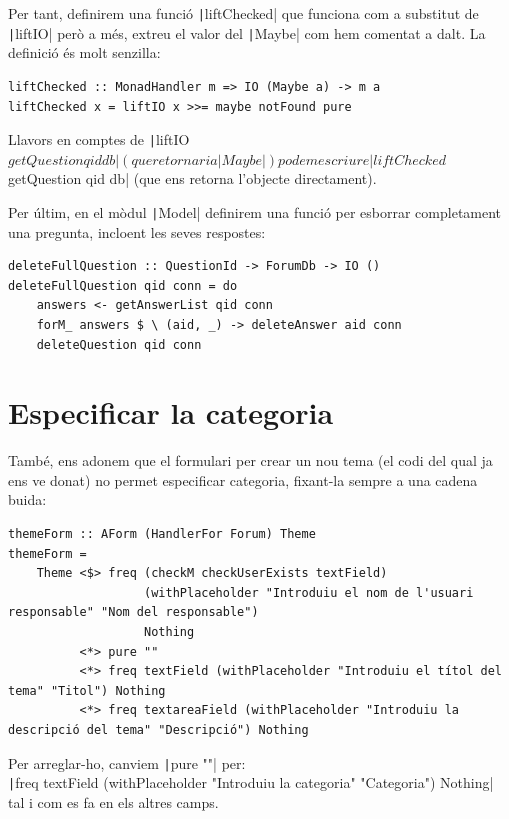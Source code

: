 \documentclass[catalan, a4paper]{scrartcl}
\begin{document}
Per tant, definirem una funció \texttt|liftChecked| que funciona com
a substitut de \texttt|liftIO| però a més, extreu el valor del \texttt|Maybe|
com hem comentat a dalt. La definició és molt senzilla:

\begin{verbatim}
liftChecked :: MonadHandler m => IO (Maybe a) -> m a
liftChecked x = liftIO x >>= maybe notFound pure
\end{verbatim}

Llavors en comptes de \texttt|liftIO $ getQuestion qid db| (que retornaria
\texttt|Maybe|) podem escriure \texttt|liftChecked $ getQuestion qid db|
(que ens retorna l'objecte directament).

Per últim, en el mòdul \texttt|Model| definirem una funció per esborrar
completament una pregunta, incloent les seves respostes:

\begin{verbatim}
deleteFullQuestion :: QuestionId -> ForumDb -> IO ()
deleteFullQuestion qid conn = do
    answers <- getAnswerList qid conn
    forM_ answers $ \ (aid, _) -> deleteAnswer aid conn
    deleteQuestion qid conn
\end{verbatim}


\section{\label{sec:form-category}Especificar la categoria}

També, ens adonem que el formulari per crear un nou tema (el codi del qual
ja ens ve donat) no permet especificar categoria, fixant-la sempre a una cadena
buida:

\begin{verbatim}
themeForm :: AForm (HandlerFor Forum) Theme
themeForm =
    Theme <$> freq (checkM checkUserExists textField)
                   (withPlaceholder "Introduiu el nom de l'usuari responsable" "Nom del responsable")
                   Nothing
          <*> pure ""
          <*> freq textField (withPlaceholder "Introduiu el títol del tema" "Titol") Nothing
          <*> freq textareaField (withPlaceholder "Introduiu la descripció del tema" "Descripció") Nothing
\end{verbatim}

Per arreglar-ho, canviem \texttt|pure ""| per: \\
\texttt|freq textField (withPlaceholder "Introduiu la categoria" "Categoria") Nothing|
tal i com es fa en els altres camps.
\end{document}
